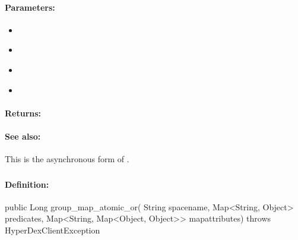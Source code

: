 \paragraph{Parameters:}
\begin{itemize}[noitemsep]
\item {}\\

\item {}\\

\item {}\\

\item {}\\

\end{itemize}

\paragraph{Returns:}


\paragraph{See also:}  This is the asynchronous form of .

\pagebreak
\subsubsection{}
\label{api:java:group_map_atomic_or}


\paragraph{Definition:}
\begin{javacode}
public Long group_map_atomic_or(
        String spacename,
        Map<String, Object> predicates,
        Map<String, Map<Object, Object>> mapattributes) throws HyperDexClientException
\end{javacode}

